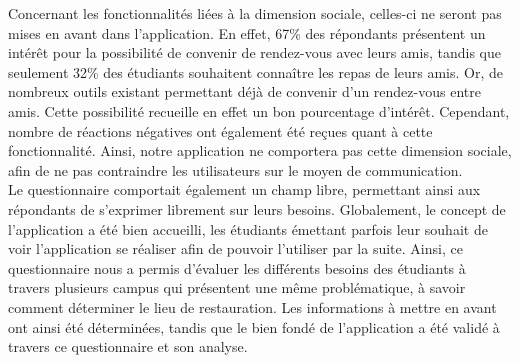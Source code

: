 Concernant les fonctionnalités liées à la dimension sociale, celles-ci ne seront pas mises en avant dans l'application. En effet, 67\% des répondants présentent un intérêt pour la possibilité de convenir de rendez-vous avec leurs amis, tandis que seulement 32\% des étudiants souhaitent connaître les repas de leurs amis. Or, de nombreux outils existant permettant déjà de convenir d'un rendez-vous entre amis. Cette possibilité recueille en effet un bon pourcentage d'intérêt. Cependant, nombre de réactions négatives ont également été reçues quant à cette fonctionnalité. Ainsi, notre application ne comportera pas cette dimension sociale, afin de ne pas contraindre les utilisateurs sur le moyen de communication. \\

Le questionnaire comportait également un champ libre, permettant ainsi aux répondants de s'exprimer librement sur leurs besoins. Globalement, le concept de l’application a été bien accueilli, les étudiants émettant parfois leur souhait de voir l'application se réaliser afin de pouvoir l’utiliser par la suite. Ainsi, ce questionnaire nous a permis d'évaluer les différents besoins des étudiants à travers plusieurs campus qui présentent une même problématique, à savoir comment déterminer le lieu de restauration. Les informations à mettre en avant ont ainsi été déterminées, tandis que le bien fondé de l'application a été validé à travers ce questionnaire et son analyse. \\
